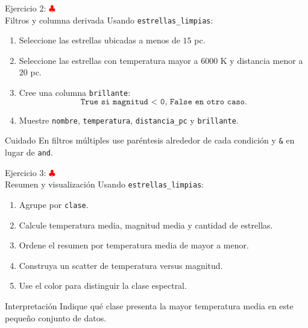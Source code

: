 \documentclass[10pt]{beamer}
\begin{document}
\begin{frame}{Ejercicio 2: \hfill \textcolor{red}{$\clubsuit$} \\ Filtros y columna derivada}
  Usando \texttt{estrellas\_limpias}:

  \begin{enumerate}
    \item Seleccione las estrellas ubicadas a menos de \(15\) pc.
    \item Seleccione las estrellas con temperatura mayor a \(6000\) K y distancia menor a \(20\) pc.
    \item Cree una columna \texttt{brillante}:
    \[
      \texttt{True si magnitud < 0, False en otro caso.}
    \]
    \item Muestre \texttt{nombre}, \texttt{temperatura}, \texttt{distancia\_pc} y \texttt{brillante}.
  \end{enumerate}

  \begin{alertblock}{Cuidado}
    En filtros múltiples use paréntesis alrededor de cada condición y \texttt{\&} en lugar de \texttt{and}.
  \end{alertblock}
\end{frame}

\begin{frame}{Ejercicio 3: \hfill \textcolor{red}{$\clubsuit$} \\ Resumen y visualización}
  Usando \texttt{estrellas\_limpias}:

  \begin{enumerate}
    \item Agrupe por \texttt{clase}.
    \item Calcule temperatura media, magnitud media y cantidad de estrellas.
    \item Ordene el resumen por temperatura media de mayor a menor.
    \item Construya un scatter de temperatura versus magnitud.
    \item Use el color para distinguir la clase espectral.
  \end{enumerate}

  \begin{block}{Interpretación}
    Indique qué clase presenta la mayor temperatura media en este pequeño conjunto de datos.
  \end{block}
\end{frame}
\end{document}
